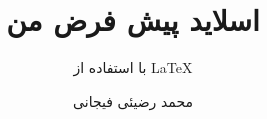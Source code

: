 \documentclass[xcolor=dvipsnames, professionalfont]{beamer}
\author{محمد رضیئی فیجانی}
\title{ اسلاید پیش فرض من }
\subtitle{با استفاده از \LaTeX}
\institute{دانشگاه صنعتی امیرکبیر}
\begin{document}
\frame{\maketitle}
\begin{frame}



\end{frame}
\end{document}
